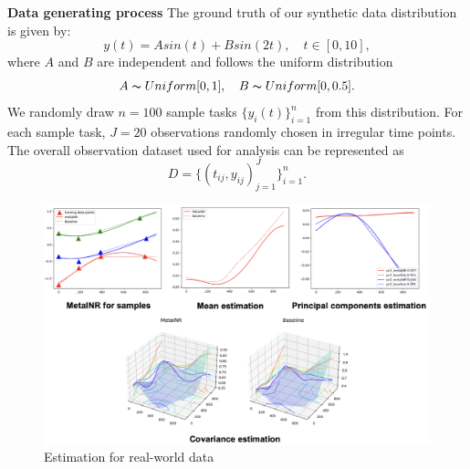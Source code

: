 \documentclass{article}
\begin{document}
\textbf{Data generating process}
The ground truth of our synthetic data distribution is given by:
$$
y(t)=A sin(t)+ B sin(2t), \quad t \in [0,10],
$$
where $A$ and $B$ are independent and follows the uniform distribution
$$
A \thicksim Uniform[0,1], \quad B \thicksim Uniform[0,0.5].
$$
We randomly draw $n=100$ sample tasks $\{y_i(t)\}_{i=1}^n$ from this distribution.
For each sample task, $J=20$ observations randomly chosen in irregular time points.
The overall observation dataset used for analysis can be represented as
$$
D=\{(t_{ij},y_{ij})_{j=1}^{J}\}_{i=1}^n.
$$
\begin{figure}
  \centering
  \includegraphics[width=\textwidth]{estimation_realData.png}
  \caption{Estimation for real-world data}
  \label{Estimation for real-world data}
\end{figure}
\end{document}
